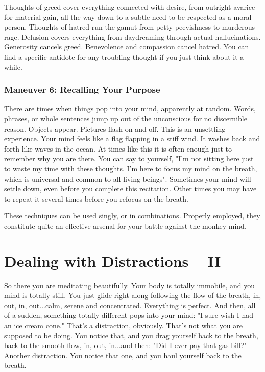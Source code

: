 Thoughts of greed cover everything connected with desire, from outright avarice
for material gain, all the way down to a subtle need to be respected as a moral
person. Thoughts of hatred run the gamut from petty peevishness to murderous
rage. Delusion covers everything from daydreaming through actual hallucinations.
Generosity cancels greed. Benevolence and compassion cancel hatred. You can find
a specific antidote for any troubling thought if you just think about it a
while.

\subsection*{Maneuver 6: Recalling Your Purpose}
There are times when things pop into your
mind, apparently at random. Words, phrases, or whole sentences jump up out of
the unconscious for no discernible reason. Objects appear. Pictures flash on and
off. This is an unsettling experience. Your mind feels like a flag flapping in a
stiff wind. It washes back and forth like waves in the ocean. At times like this
it is often enough just to remember why you are there. You can say to yourself,
"I'm not sitting here just to waste my time with these thoughts. I'm here to
focus my mind on the breath, which is universal and common to all living
beings". Sometimes your mind will settle down, even before you complete this
recitation. Other times you may have to repeat it several times before you
refocus on the breath.

These techniques can be used singly, or in combinations. Properly employed, they
constitute quite an effective arsenal for your battle against the monkey mind.

\chapter{ Dealing with Distractions – II}
 So there you are meditating
beautifully. Your body is totally immobile, and you mind is totally still. You
just glide right along following the flow of the breath, in, out, in,
out...calm, serene and concentrated. Everything is perfect. And then, all of a
sudden, something totally different pops into your mind: "I sure wish I had an
ice cream cone." That's a distraction, obviously. That's not what you are
supposed to be doing. You notice that, and you drag yourself back to the breath,
back to the smooth flow, in, out, in...and then: "Did I ever pay that gas bill?"
Another distraction. You notice that one, and you haul yourself back to the
breath.

